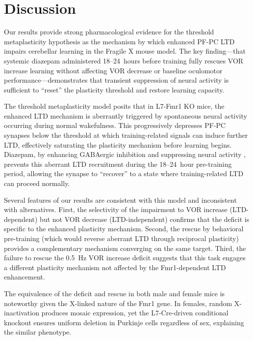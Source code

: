 \documentclass[11pt]{article}
\begin{document}
\section{Discussion}

Our results provide strong pharmacological evidence for the threshold metaplasticity hypothesis as the mechanism by which enhanced PF-PC LTD impairs cerebellar learning in the Fragile X mouse model. The key finding---that systemic diazepam administered 18--24~hours before training fully rescues VOR increase learning without affecting VOR decrease or baseline oculomotor performance---demonstrates that transient suppression of neural activity is sufficient to ``reset'' the plasticity threshold and restore learning capacity.

The threshold metaplasticity model \citep{abraham2008metaplasticity, bienenstock1982theory} posits that in L7-Fmr1 KO mice, the enhanced LTD mechanism is aberrantly triggered by spontaneous neural activity occurring during normal wakefulness. This progressively depresses PF-PC synapses below the threshold at which training-related signals can induce further LTD, effectively saturating the plasticity mechanism before learning begins. Diazepam, by enhancing GABAergic inhibition and suppressing neural activity \citep{rudolph2004beyond, stahl2012mechanism}, prevents this aberrant LTD recruitment during the 18--24~hour pre-training period, allowing the synapse to ``recover'' to a state where training-related LTD can proceed normally.

Several features of our results are consistent with this model and inconsistent with alternatives. First, the selectivity of the impairment to VOR increase (LTD-dependent) but not VOR decrease (LTD-independent) confirms that the deficit is specific to the enhanced plasticity mechanism. Second, the rescue by behavioral pre-training (which would reverse aberrant LTD through reciprocal plasticity) provides a complementary mechanism converging on the same target. Third, the failure to rescue the 0.5~Hz VOR increase deficit suggests that this task engages a different plasticity mechanism not affected by the Fmr1-dependent LTD enhancement.

The equivalence of the deficit and rescue in both male and female mice is noteworthy given the X-linked nature of the Fmr1 gene. In females, random X-inactivation produces mosaic expression, yet the L7-Cre-driven conditional knockout ensures uniform deletion in Purkinje cells regardless of sex, explaining the similar phenotype.
\end{document}
